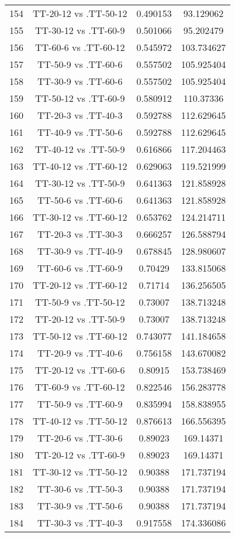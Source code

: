 \documentclass[a4paper,10pt]{article}
\begin{document}
\begin{landscape}
\begin{table}[!htp]
\begin{tabular}{cccc}
154&TT-20-12 vs .TT-50-12&0.490153&93.129062\\
155&TT-30-12 vs .TT-60-9&0.501066&95.202479\\
156&TT-60-6 vs .TT-60-12&0.545972&103.734627\\
157&TT-50-9 vs .TT-60-6&0.557502&105.925404\\
158&TT-30-9 vs .TT-60-6&0.557502&105.925404\\
159&TT-50-12 vs .TT-60-9&0.580912&110.37336\\
160&TT-20-3 vs .TT-40-3&0.592788&112.629645\\
161&TT-40-9 vs .TT-50-6&0.592788&112.629645\\
162&TT-40-12 vs .TT-50-9&0.616866&117.204463\\
163&TT-40-12 vs .TT-60-12&0.629063&119.521999\\
164&TT-30-12 vs .TT-50-9&0.641363&121.858928\\
165&TT-50-6 vs .TT-60-6&0.641363&121.858928\\
166&TT-30-12 vs .TT-60-12&0.653762&124.214711\\
167&TT-20-3 vs .TT-30-3&0.666257&126.588794\\
168&TT-30-9 vs .TT-40-9&0.678845&128.980607\\
169&TT-60-6 vs .TT-60-9&0.70429&133.815068\\
170&TT-20-12 vs .TT-60-12&0.71714&136.256505\\
171&TT-50-9 vs .TT-50-12&0.73007&138.713248\\
172&TT-20-12 vs .TT-50-9&0.73007&138.713248\\
173&TT-50-12 vs .TT-60-12&0.743077&141.184658\\
174&TT-20-9 vs .TT-40-6&0.756158&143.670082\\
175&TT-20-12 vs .TT-60-6&0.80915&153.738469\\
176&TT-60-9 vs .TT-60-12&0.822546&156.283778\\
177&TT-50-9 vs .TT-60-9&0.835994&158.838955\\
178&TT-40-12 vs .TT-50-12&0.876613&166.556395\\
179&TT-20-6 vs .TT-30-6&0.89023&169.14371\\
180&TT-20-12 vs .TT-60-9&0.89023&169.14371\\
181&TT-30-12 vs .TT-50-12&0.90388&171.737194\\
182&TT-30-6 vs .TT-50-3&0.90388&171.737194\\
183&TT-30-9 vs .TT-50-6&0.90388&171.737194\\
184&TT-30-3 vs .TT-40-3&0.917558&174.336086\\

\end{tabular}
\end{table}
\end{landscape}
\end{document}
